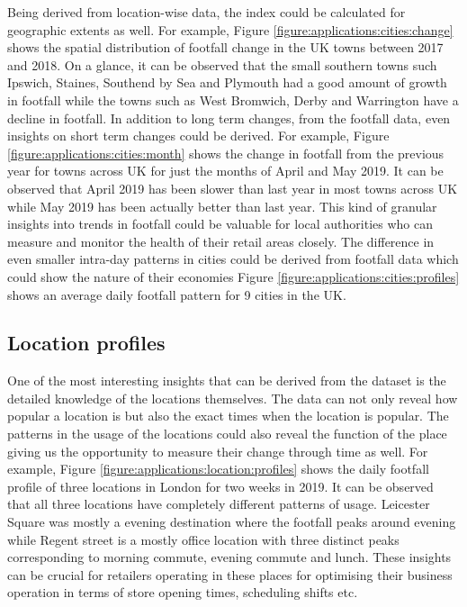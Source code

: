 Being derived from location-wise data, the index could be calculated for geographic extents as well.
For example, Figure \ref{figure:applications:cities:change} shows the spatial distribution of footfall change in the UK towns between 2017 and 2018.
On a glance, it can be observed that the small southern towns such Ipswich, Staines, Southend by Sea and Plymouth had a good amount of growth in footfall while the towns such as West Bromwich, Derby and Warrington have a decline in footfall.
In addition to long term changes, from the footfall data, even insights on short term changes could be derived.
For example, Figure \ref{figure:applications:cities:month} shows the change in footfall from the previous year for towns across UK for just the months of April and May 2019.
It can be observed that April 2019 has been slower than last year in most towns across UK while May 2019 has been actually better than last year.
This kind of granular insights into trends in footfall could be valuable for local authorities who can measure and monitor the health of their retail areas closely. The difference in even smaller intra-day patterns in cities could be derived from footfall data which could show the nature of their economies
Figure \ref{figure:applications:cities:profiles} shows an average daily footfall pattern for 9 cities in the UK.

\subsection{Location profiles}

One of the most interesting insights that can be derived from the dataset is the detailed knowledge of the locations themselves.
The data can not only reveal how popular a location is but also the exact times when the location is popular.
The patterns in the usage of the locations could also reveal the function of the place giving us the opportunity to measure their change through time as well.
For example, Figure \ref{figure:applications:location:profiles} shows the daily footfall profile of three locations in London for two weeks in 2019.
It can be observed that all three locations have completely different patterns of usage.
Leicester Square was mostly a evening destination where the footfall peaks around evening while Regent street is a mostly office location with three distinct peaks corresponding to morning commute, evening commute and lunch.
These insights can be crucial for retailers operating in these places for optimising their business operation in terms of store opening times, scheduling shifts etc.

